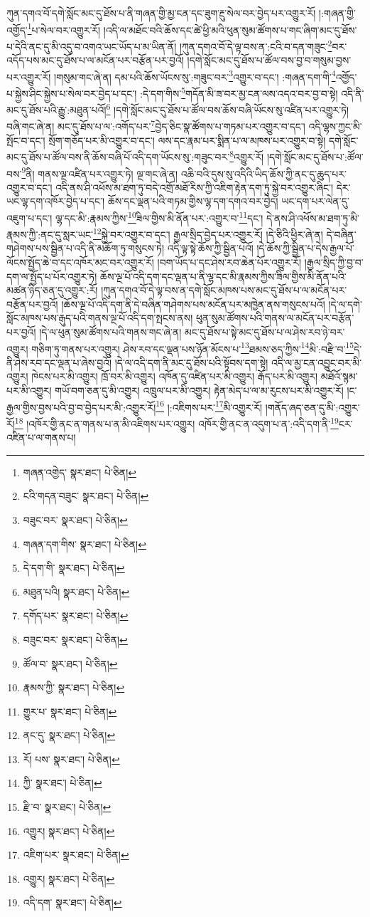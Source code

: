 ཀུན་དགའ་བོ་དགེ་སློང་མང་དུ་ཐོས་པ་ནི་གཞན་གྱི་མྱ་ངན་དང་ཟུག་རྔུ་སེལ་བར་བྱེད་པར་འགྱུར་རོ། །:གཞན་གྱི་འགྱོད་\footnote{གཞན་འགྱེད་  སྣར་ཐང་།  པེ་ཅིན། }པ་སེལ་བར་འགྱུར་རོ། །འདི་ལ་མཐོང་བའི་ཆོས་དང་ཚེ་ཕྱི་མའི་ཕུན་སུམ་ཚོགས་པ་གང་ཞིག་མང་དུ་ཐོས་པ་དེའི་ནང་དུ་མི་འདུ་བ་འགའ་ཡང་ཡོད་པ་མ་ཡིན་ནོ། །ཀུན་དགའ་བོ་དེ་ལྟ་བས་ན་:ངའི་བ་དན་གཟུང་\footnote{ངའི་གདན་བཟུང་  སྣར་ཐང་།  པེ་ཅིན། }བར་འདོད་པས་མང་དུ་ཐོས་པ་ལ་མངོན་པར་བརྩོན་པར་བྱའོ། །དགེ་སློང་མང་དུ་ཐོས་པ་ཚོལ་བས་བྱ་བ་གསུམ་བྱས་པར་འགྱུར་རོ། །གསུམ་གང་ཞེ་ན། དམ་པའི་ཆོས་ཡོངས་སུ་:གཟུང་བར་\footnote{བཟུང་བར་  སྣར་ཐང་།  པེ་ཅིན། }འགྱུར་བ་དང་། :གཞན་དག་གི་\footnote{གཞན་དག་གིས་  སྣར་ཐང་།  པེ་ཅིན། }འགྱོད་པ་སྐྱེས་ཤིང་སྐྱེས་པ་སེལ་བར་བྱེད་པ་དང་། :དེ་དག་གིས་\footnote{དེ་དག་གི་  སྣར་ཐང་།  པེ་ཅིན། }གདོན་མི་ཟ་བར་མྱ་ངན་ལས་འདའ་བར་བྱ་བ་སྟེ། འདི་ནི་མང་དུ་ཐོས་པའི་རྒྱུ་:མཐུན་པའོ།\footnote{མཐུན་པའི།  སྣར་ཐང་།  པེ་ཅིན། } །དགེ་སློང་མང་དུ་ཐོས་པ་ཚོལ་བས་ཆོས་བཞི་ཡོངས་སུ་འཛིན་པར་འགྱུར་ཏེ། བཞི་གང་ཞེ་ན། མང་དུ་ཐོས་པ་ལ་:འགོད་པར་\footnote{དགོད་པར་  སྣར་ཐང་།  པེ་ཅིན། }བྱེད་ཅིང་སྣ་ཚོགས་པ་གཏམ་པར་འགྱུར་བ་དང་། འདི་ལྷས་ཀྱང་མི་སྤོང་བ་དང་། སྲོག་གཅོད་པར་མི་འགྱུར་བ་དང་། ལས་དང་རྣམ་པར་སྨིན་པ་ལ་མཁས་པར་འགྱུར་བ་སྟེ། དགེ་སློང་མང་དུ་ཐོས་པ་ཚོལ་བས་ནི་ཆོས་བཞི་པོ་འདི་དག་ཡོངས་སུ་:གཟུང་བར་\footnote{བཟུང་བར་  སྣར་ཐང་།  པེ་ཅིན། }འགྱུར་རོ། །དགེ་སློང་མང་དུ་ཐོས་པ་:ཚོལ་བས་\footnote{ཚོལ་བ་  སྣར་ཐང་།  པེ་ཅིན། }ནི། གནས་ལྔ་འཛིན་པར་འགྱུར་ཏེ། ལྔ་གང་ཞེ་ན། འཆི་བའི་དུས་སུ་འདིའི་ཡིད་ཆོས་ཀྱི་ནང་དུ་ཆུད་པར་འགྱུར་བ་དང་། འདི་ནས་ཤི་འཕོས་མ་ཐག་ཏུ་བདེ་འགྲོ་མཐོ་རིས་ཀྱི་འཇིག་རྟེན་དག་ཏུ་སྐྱེ་བར་འགྱུར་ཞིང་། དེར་ཡང་ལྷ་དག་འཁོར་བྱེད་པ་དང་། ཆོས་དང་ལྡན་པའི་གཏམ་གྱིས་ལྷ་དག་དགའ་བར་བྱེད། ཡང་དག་པར་ལེན་དུ་འཇུག་པ་དང་། ལྷ་དང་མི་:རྣམས་ཀྱིས་\footnote{རྣམས་ཀྱི་  སྣར་ཐང་།  པེ་ཅིན། }ཟིལ་གྱིས་མི་ནོན་པར་:འགྱུར་བ་\footnote{གྱུར་པ་  སྣར་ཐང་།  པེ་ཅིན། }དང་། དེ་ནས་ཤི་འཕོས་མ་ཐག་ཏུ་མི་རྣམས་ཀྱི་:ནང་དུ་སླར་ཡང་\footnote{ནང་དུ་  སྣར་ཐང་།  པེ་ཅིན། }སྐྱེ་བར་འགྱུར་བ་དང་། རྒྱལ་སྲིད་བྱེད་པར་འགྱུར་རོ། །དེ་ཅིའི་ཕྱིར་ཞེ་ན། དེ་བཞིན་གཤེགས་པས་སྦྱིན་པ་འདི་ནི་མཆོག་ཏུ་གསུངས་ཏེ། འདི་ལྟ་སྟེ་ཆོས་ཀྱི་སྦྱིན་པའོ། །དེ་ཆོས་ཀྱི་སྦྱིན་པ་དེས་རྒྱལ་པོ་ལོངས་སྤྱོད་ཆེ་བ་དང་འཁོར་མང་བར་འགྱུར་རོ། །བག་ཡོད་པ་དང་ཤེས་རབ་ཆེན་པོར་འགྱུར་རོ། །རྒྱལ་སྲིད་ཀྱི་བྱ་བ་དག་ལ་སྤྱོད་པ་པོར་འགྱུར་ཏེ། ཆོས་ལྔ་པོ་འདི་དག་དང་ལྡན་པ་ནི་ལྷ་དང་མི་རྣམས་ཀྱིས་ཟིལ་གྱིས་མི་ནོན་པའི་མཚན་ཉིད་ཅན་དུ་འགྱུར་:རོ། །ཀུན་དགའ་བོ་དེ་ལྟ་བས་ན་དགེ་སློང་མཁས་པས་མང་དུ་ཐོས་པ་ལ་མངོན་པར་བརྩོན་པར་བྱའོ། །ཆོས་ལྔ་པོ་འདི་དག་ནི་དེ་བཞིན་གཤེགས་པས་མངོན་པར་མཁྱེན་ནས་གསུངས་པའོ། །དེ་ལ་དགེ་སློང་མཁས་པས་རྒུད་པའི་གནས་ལྔ་པོ་འདི་དག་སྤངས་ནས། ཕུན་སུམ་ཚོགས་པའི་གནས་ལ་མངོན་པར་བརྩོན་པར་བྱའོ། །དེ་ལ་ཕུན་སུམ་ཚོགས་པའི་གནས་གང་ཞེ་ན། མང་དུ་ཐོས་པ་སྟེ་མང་དུ་ཐོས་པ་ལ་ཤེས་རབ་ཉེ་བར་འགྱུར། གཅིག་ཏུ་གནས་པར་འགྱུར། ཤེས་རབ་དང་ལྡན་པས་ཉོན་མོངས་པ་\footnote{རོ། པས་  སྣར་ཐང་།  པེ་ཅིན། }ཐམས་ཅད་ཀྱིས་\footnote{ཀྱི་  སྣར་ཐང་།  པེ་ཅིན། }མི་:བརྫི་བ་\footnote{རྫི་བ་  སྣར་ཐང་།  པེ་ཅིན། }དེ་ནི་ཤེས་རབ་དང་ལྡན་པ་ཞེས་བྱའོ། །དེ་ལ་འདི་དག་ནི་མང་དུ་ཐོས་པའི་སྟོབས་དག་སྟེ། འདི་ལ་མྱ་ངན་འབྱུང་བར་མི་འགྱུར། ཁེངས་པར་མི་འགྱུར། ཁྲོ་བར་མི་འགྱུར། འཁོན་དུ་འཛིན་པར་མི་འགྱུར། རྒོད་པར་མི་འགྱུར། མཐོའོ་སྙམ་པར་མི་འགྱུར། གཡོ་བག་ཅན་དུ་མི་འགྱུར། འཁྲུལ་པར་མི་འགྱུར། རྟེན་མེད་པ་ལ་མ་རུངས་པར་མི་འགྱུར་རོ། །ང་རྒྱལ་གྱིས་བྱས་པའི་བྱ་བ་བྱེད་པར་མི་:འགྱུར་རོ།\footnote{འགྱུར།  སྣར་ཐང་།  པེ་ཅིན། } །:འཇིགས་པར་\footnote{འཇིག་པར་  སྣར་ཐང་།  པེ་ཅིན། }མི་འགྱུར་རོ། །གནོད་ཞད་ཅན་དུ་མི་:འགྱུར་རོ།\footnote{འགྱུར།  སྣར་ཐང་།  པེ་ཅིན། } །འཁོར་གྱི་ནང་ན་གནས་པ་ན་མི་འཇིགས་པར་འགྱུར། འཁོར་གྱི་ནང་ན་འདུག་པ་ན་:འདི་དག་ནི་\footnote{འདི་དག་  སྣར་ཐང་།  པེ་ཅིན། }ངར་འཛིན་པ་ལ་གནས་པ། 